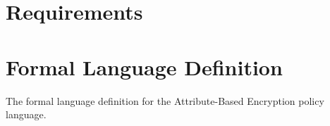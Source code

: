 \section{Requirements}



\section{Formal Language Definition}
The formal language definition for the Attribute-Based Encryption policy language.










